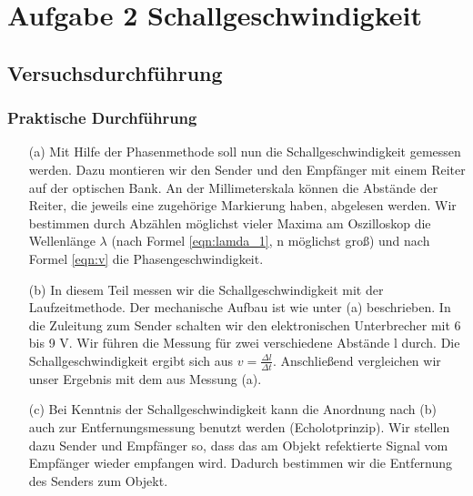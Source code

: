 \documentclass[12pt]{scrartcl}
\begin{document}
\section{Aufgabe 2 Schallgeschwindigkeit}
\subsection{Versuchsdurchführung}
\subsubsection{Praktische Durchführung}
\begin{itemize}
\item[(a)]
Mit Hilfe der Phasenmethode soll nun die Schallgeschwindigkeit gemessen werden. Dazu montieren wir den Sender und den Empfänger mit einem Reiter auf der optischen Bank. An der Millimeterskala können die Abstände der Reiter, die jeweils eine zugehörige Markierung haben, abgelesen werden. Wir bestimmen durch Abzählen möglichst vieler Maxima am Oszilloskop die Wellenlänge $\lambda$
(nach Formel \ref{eqn:lamda_1}, n möglichst groß) 
und nach Formel
\ref{eqn:v}
die Phasengeschwindigkeit.
\item[(b)]
In diesem Teil messen wir die Schallgeschwindigkeit mit der Laufzeitmethode. Der mechanische Aufbau ist wie unter (a) beschrieben. In die Zuleitung zum Sender schalten wir den elektronischen Unterbrecher mit 6 bis 9 V. Wir führen die Messung für zwei verschiedene Abstände l durch. Die Schallgeschwindigkeit ergibt sich aus $v = \frac{\Delta l}{\Delta t}$. Anschließend vergleichen wir unser Ergebnis mit dem aus Messung (a).
\item[(c)]
Bei Kenntnis der Schallgeschwindigkeit kann die Anordnung nach (b) auch zur Entfernungsmessung benutzt werden (Echolotprinzip). Wir stellen dazu Sender und Empfänger so, dass das am Objekt refektierte Signal vom Empfänger wieder empfangen wird. Dadurch bestimmen wir die Entfernung des Senders zum Objekt.
\end{itemize}
\end{document}
